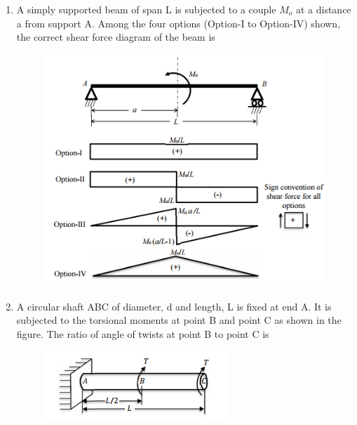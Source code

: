 \documentclass[a4paper,10pt]{article}
\begin{document}
\begin{enumerate}
    \item A simply supported beam of span L is subjected to a couple $M_o$ at a distance a from support A. Among the four options (Option-I to Option-IV) shown, the correct shear force diagram of the beam is
    \begin{figure}[H] \centering \includegraphics[width=0.8\columnwidth]{q15_solid.png} \caption*{} \label{fig:q15_solid} \end{figure}
    \hfill{}
    \begin{enumerate}[label=\Alph*)]
    \end{enumerate}

    \item A circular shaft ABC of diameter, d and length, L is fixed at end A. It is subjected to the torsional moments at point B and point C as shown in the figure. The ratio of angle of twists at point B to point C is
    \begin{figure}[H] \centering \includegraphics[width=0.6\columnwidth]{q16_solid.png} \caption*{} \label{fig:q16_solid} \end{figure}
    \hfill{}
    \begin{enumerate}[label=\Alph*)]
    \end{enumerate}


\end{enumerate}
\end{document}
